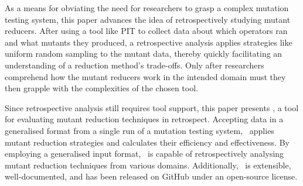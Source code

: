 


As a means for obviating the need for researchers to grasp a complex mutation testing system, this paper advances the
idea of retrospectively studying mutant reducers.  After using a tool like PIT to collect data about which operators ran
and what mutants they produced, a retrospective analysis applies strategies like uniform random sampling to the mutant
data, thereby quickly facilitating an understanding of a reduction method's trade-offs. Only after researchers
comprehend how the mutant reducers work in the intended domain must they then grapple with the complexities of the
chosen tool.


Since retrospective analysis still requires tool support, this paper presents \mr, a tool for evaluating mutant
reduction techniques in retrospect. Accepting data in a generalised format from a single run of a mutation testing
system, \mr~applies mutant reduction strategies and calculates their efficiency and effectiveness.  By employing a
generalised input format, \mr~is capable of retrospectively analysing mutant reduction techniques from various domains.
Additionally, \mr~is extensible, well-documented, and has been released on GitHub under an open-source license.






